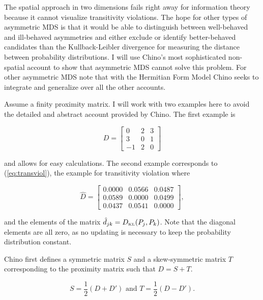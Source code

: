 \documentclass[11pt]{article}
\begin{document}
The spatial approach in two dimensions fails right away for
information theory because it cannot visualize transitivity
violations. The hope for other types of asymmetric MDS is that it
would be able to distinguish between well-behaved and ill-behaved
asymmetries and either exclude or identify better-behaved candidates
than the Kullback-Leibler divergence for measuring the distance
between probability distributions. I will use Chino's most
sophisticated non-spatial account to show that asymmetric MDS cannot
solve this problem. For other asymmetric MDS note that with the
Hermitian Form Model Chino seeks to integrate and generalize over all
the other accounts. 

Assume a finity proximity matrix. I will work with two examples here
to avoid the detailed and abstract account provided by Chino. The
first example is

\begin{equation}
  \label{eq:simpromat}
D=\left[
      \begin{array}{ccc}
        0 & 2 & 3 \\
        3 & 0 & 1 \\
        -1 & 2 & 0 
      \end{array}
\right]
\end{equation}

and allows for easy calculations. The second example corresponds to
(\ref{eq:transviol}), the example for transitivity violation where

\begin{equation}
  \label{eq:dklpromat}
\hat{D}=\left[
      \begin{array}{ccc}
0.0000 &  0.0566 &  0.0487 \\
0.0589 &  0.0000 &  0.0499 \\
0.0437 &  0.0541 &  0.0000
      \end{array}
\right],
\end{equation}

and the elements of the matrix $\hat{d}_{jk}=D_{\mbox{\tiny KL}}(P_{j},P_{k})$.
Note that the diagonal elements are all zero, as no updating is
necessary to keep the probability distribution constant.

Chino first defines a symmetric matrix $S$ and a skew-symmetric matrix
$T$ corresponding to the proximity matrix such that $D=S+T$.

\begin{equation}
  \label{eq:skewsym}
  S=\frac{1}{2}(D+D')\mbox{ and }T=\frac{1}{2}(D-D').
\end{equation}
\end{document}
